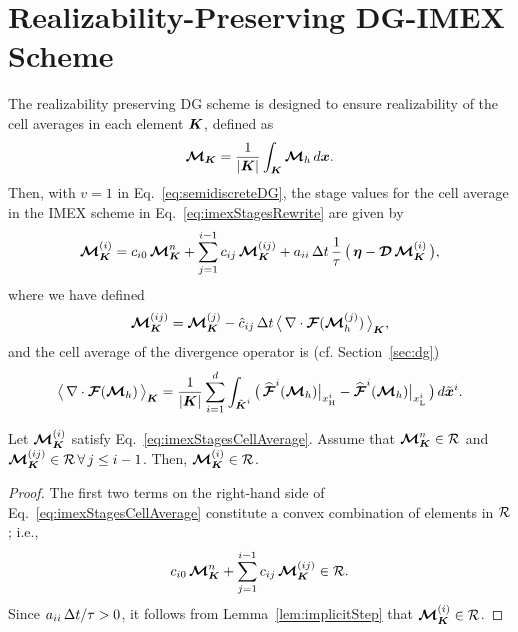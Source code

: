 \section{Realizability-Preserving DG-IMEX Scheme}
\label{sec:realizableDGIMEX}

The realizability preserving DG scheme is designed to ensure realizability of the cell averages in each element $\boldsymbol{K}$, defined as
\begin{equation}
  \boldsymbol{\mathcal{M}}_{\boldsymbol{K}}
  =\frac{1}{|\boldsymbol{K}|}\int_{\boldsymbol{K}}\boldsymbol{\mathcal{M}}_{h}\,d\boldsymbol{x}.  
\end{equation}
Then, with $v=1$ in Eq.~\eqref{eq:semidiscreteDG}, the stage values for the cell average in the IMEX scheme in Eq.~\eqref{eq:imexStagesRewrite} are given by
\begin{equation}
  \boldsymbol{\mathcal{M}}_{\boldsymbol{K}}^{(i)}
  =c_{i0}\,\boldsymbol{\mathcal{M}}_{\boldsymbol{K}}^{n}
  +\sum_{j=1}^{i-1}c_{ij}\,\boldsymbol{\mathcal{M}}_{\boldsymbol{K}}^{(ij)}
  +a_{ii}\,\Delta t\,\frac{1}{\tau}\,\big(\,\boldsymbol{\eta}-\boldsymbol{\mathcal{D}}\,\boldsymbol{\mathcal{M}}_{\boldsymbol{K}}^{(i)}\,\big),
  \label{eq:imexStagesCellAverage}
\end{equation}
where we have defined
\begin{equation}
  \boldsymbol{\mathcal{M}}_{\boldsymbol{K}}^{(ij)}
  =\boldsymbol{\mathcal{M}}_{\boldsymbol{K}}^{(j)}-\hat{c}_{ij}\,\Delta t\,\big\langle\,\nabla\cdot\boldsymbol{\mathcal{F}}(\boldsymbol{\mathcal{M}}_{h}^{(j)})\,\big\rangle_{\boldsymbol{K}},
\end{equation}
and the cell average of the divergence operator is (cf. Section~\ref{sec:dg})
\begin{equation}
  \big\langle\,\nabla\cdot\boldsymbol{\mathcal{F}}(\boldsymbol{\mathcal{M}}_{h})\,\big\rangle_{\boldsymbol{K}}
  =\frac{1}{|\boldsymbol{K}|}\sum_{i=1}^{d}\int_{\tilde{\boldsymbol{K}}^{i}}
  \big(\,\widehat{\boldsymbol{\mathcal{F}}}^{i}(\boldsymbol{\mathcal{M}}_{h})\big|_{x_{\mbox{\tiny H}}^{i}}-\widehat{\boldsymbol{\mathcal{F}}}^{i}(\boldsymbol{\mathcal{M}}_{h})\big|_{x_{\mbox{\tiny L}}^{i}}\,\big)\,d\tilde{\boldsymbol{x}}^{i}.  
\end{equation}

\begin{lemma}
  Let $\boldsymbol{\mathcal{M}}_{\boldsymbol{K}}^{(i)}$ satisfy Eq.~\eqref{eq:imexStagesCellAverage}.
  Assume that $\boldsymbol{\mathcal{M}}_{\boldsymbol{K}}^{n}\in\mathcal{R}$ and $\boldsymbol{\mathcal{M}}_{\boldsymbol{K}}^{(ij)}\in\mathcal{R}\,\forall\,j\le i-1$.  
  Then, $\boldsymbol{\mathcal{M}}_{\boldsymbol{K}}^{(i)}\in\mathcal{R}$.  
\end{lemma}
\begin{proof}
  The first two terms on the right-hand side of Eq.~\eqref{eq:imexStagesCellAverage} constitute a convex combination of elements in $\mathcal{R}$; i.e.,
  \begin{equation*}
    c_{i0}\,\boldsymbol{\mathcal{M}}_{\boldsymbol{K}}^{n}+\sum_{j=1}^{i-1}c_{ij}\,\boldsymbol{\mathcal{M}}_{\boldsymbol{K}}^{(ij)}\in\mathcal{R}.
  \end{equation*}
  Since $a_{ii}\,\Delta t/\tau>0$, it follows from Lemma~\ref{lem:implicitStep} that $\boldsymbol{\mathcal{M}}_{\boldsymbol{K}}^{(i)}\in\mathcal{R}$.  
\end{proof}

